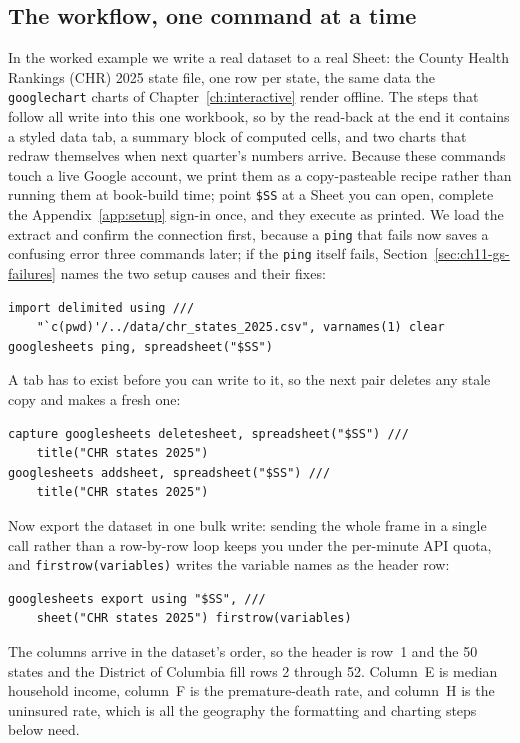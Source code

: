 \documentclass[
    a4paper,
    fontsize=10pt,
    twoside=true,
    numbers=noenddot,
]{kaobook}
\begin{document}
\subsection{The workflow, one command at a time}
In the worked example we write a real dataset to a real Sheet: the County Health Rankings (CHR) 2025 state file, one row per state, the same data the \texttt{googlechart} charts of Chapter~\ref{ch:interactive} render offline. The steps that follow all write into this one workbook, so by the read-back at the end it contains a styled data tab, a summary block of computed cells, and two charts that redraw themselves when next quarter's numbers arrive. Because these commands touch a live Google account, we print them as a copy-pasteable recipe rather than running them at book-build time; point \texttt{\$SS} at a Sheet you can open, complete the Appendix~\ref{app:setup} sign-in once, and they execute as printed. We load the extract and confirm the connection first, because a \texttt{ping} that fails now saves a confusing error three commands later; if the \texttt{ping} itself fails, Section~\ref{sec:ch11-gs-failures} names the two setup causes and their fixes:
\par
{\footnotesize
\begin{verbatim}
import delimited using ///
    "`c(pwd)'/../data/chr_states_2025.csv", varnames(1) clear
googlesheets ping, spreadsheet("$SS")
\end{verbatim}
}
A tab has to exist before you can write to it, so the next pair deletes any stale copy and makes a fresh one:
\par
{\footnotesize
\begin{verbatim}
capture googlesheets deletesheet, spreadsheet("$SS") ///
    title("CHR states 2025")
googlesheets addsheet, spreadsheet("$SS") ///
    title("CHR states 2025")
\end{verbatim}
}
Now export the dataset in one bulk write: sending the whole frame in a single call rather than a row-by-row loop keeps you under the per-minute API quota, and \texttt{firstrow(variables)} writes the variable names as the header row:
\par
{\footnotesize
\begin{verbatim}
googlesheets export using "$SS", ///
    sheet("CHR states 2025") firstrow(variables)
\end{verbatim}
}
The columns arrive in the dataset's order, so the header is row~1 and the 50 states and the District of Columbia fill rows 2 through 52. Column~E is median household income, column~F is the premature-death rate, and column~H is the uninsured rate, which is all the geography the formatting and charting steps below need.
\end{document}
